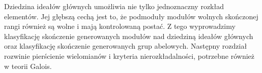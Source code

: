 \begin{uwaga}
\label{aa:uw:pid-module-link}
Dziedzina ideałów głównych umożliwia nie tylko jednoznaczny
rozkład elementów. Jej głębszą cechą jest to, że podmoduły
modułów wolnych skończonej rangi również są wolne i mają
kontrolowaną postać. Z tego wyprowadzimy klasyfikację
skończenie generowanych modułów nad dziedziną ideałów
głównych oraz klasyfikację skończenie generowanych grup
abelowych. Następny rozdział rozwinie pierścienie wielomianów
i kryteria nierozkładalności, potrzebne również w teorii Galois.
\end{uwaga}
\setlength{\parskip}{4pt}
